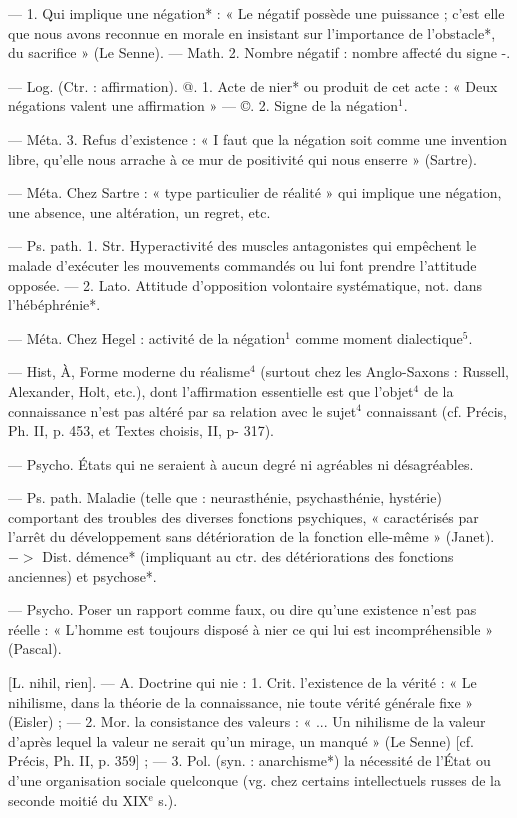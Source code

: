 \begin{itemize}[leftmargin=1cm, label=, itemsep=1pt]
 — 1. Qui implique une négation* : « Le négatif possède une
puissance ; c’est elle que nous avons
reconnue en morale en insistant
sur l'importance de l’obstacle*, du
sacrifice » (Le Senne). — Math. 2.
Nombre négatif : nombre affecté du
signe -.

 — Log. (Ctr. : affirmation).
@. 1. Acte de nier* ou produit de
cet acte : « Deux négations valent
une affirmation » — ©. 2. Signe
de la négation$^1$.

— Méta. 3. Refus d'existence :
« I faut que la négation soit comme
une invention libre, qu’elle nous
arrache à ce mur de positivité qui
nous enserre » (Sartre).

 — Méta. Chez Sartre : « type
particulier de réalité » qui implique
une négation, une absence, une
altération, un regret, etc.

 — Ps. path. 1. Str.
Hyperactivité des muscles antagonistes qui empêchent le malade
d'exécuter les mouvements commandés ou lui font prendre l’attitude opposée. — 2. Lato. Attitude
d'opposition volontaire systématique, not. dans l’hébéphrénie*.

 — Méta. Chez Hegel : activité de la négation$^1$ comme moment
dialectique$^5$.

 — Hist, À, Forme moderne du réalisme$^4$ (surtout chez les
Anglo-Saxons : Russell, Alexander,
Holt, etc.), dont l'affirmation essentielle est que l'objet$^4$ de la connaissance n’est pas altéré par sa relation
avec le sujet$^4$ connaissant (cf. Précis,
Ph. II, p. 453, et Textes choisis, II,
p- 317).

 — Psycho. États qui
ne seraient à aucun degré ni agréables ni désagréables.

 — Ps. path. Maladie (telle
que : neurasthénie, psychasthénie,
hystérie) comportant des troubles
des diverses fonctions psychiques,
« caractérisés par l'arrêt du développement sans détérioration de la
fonction elle-même » (Janet). $->$
Dist. démence* (impliquant au ctr.
des détériorations des fonctions anciennes) et psychose*.

 — Psycho. Poser un rapport
comme faux, ou dire qu’une existence n’est pas réelle : « L'homme
est toujours disposé à nier ce qui lui
est incompréhensible » (Pascal).

 [L. nihil, rien]. — A. Doctrine qui nie : 1. Crit. l’existence de
la vérité : « Le nihilisme, dans la
théorie de la connaissance, nie toute
vérité générale fixe » (Eisler) ; —
2. Mor. la consistance des valeurs :
« ... Un nihilisme de la valeur d’après
lequel la valeur ne serait qu’un
mirage, un manqué » (Le Senne)
[cf. Précis, Ph. II, p. 359] ; — 3. Pol.
(syn. : anarchisme*) la nécessité de
l'État ou d’une organisation sociale
quelconque (vg. chez certains intellectuels russes de la seconde moitié
du {\footnotesize XIX}$^\text{e}$ s.).


\end{itemize}
